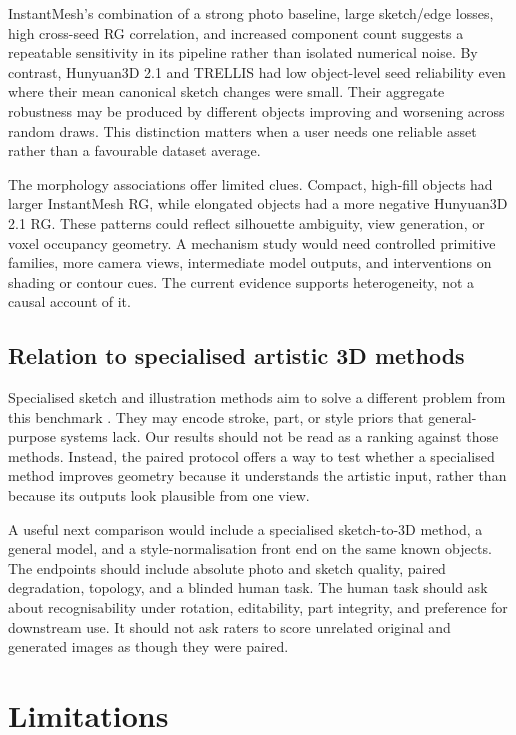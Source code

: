 \documentclass[12pt,a4paper]{article}
\begin{document}
InstantMesh's combination of a strong photo baseline, large sketch/edge losses, high cross-seed RG correlation, and increased component count suggests a repeatable sensitivity in its pipeline rather than isolated numerical noise. By contrast, Hunyuan3D 2.1 and TRELLIS had low object-level seed reliability even where their mean canonical sketch changes were small. Their aggregate robustness may be produced by different objects improving and worsening across random draws. This distinction matters when a user needs one reliable asset rather than a favourable dataset average.

The morphology associations offer limited clues. Compact, high-fill objects had larger InstantMesh RG, while elongated objects had a more negative Hunyuan3D 2.1 RG. These patterns could reflect silhouette ambiguity, view generation, or voxel occupancy geometry. A mechanism study would need controlled primitive families, more camera views, intermediate model outputs, and interventions on shading or contour cues. The current evidence supports heterogeneity, not a causal account of it.

\subsection{Relation to specialised artistic 3D methods}

Specialised sketch and illustration methods aim to solve a different problem from this benchmark \parencite{sanghi2023sketchashape,zheng2024sketch3d,lee2025pasta,cong2025art3d}. They may encode stroke, part, or style priors that general-purpose systems lack. Our results should not be read as a ranking against those methods. Instead, the paired protocol offers a way to test whether a specialised method improves geometry because it understands the artistic input, rather than because its outputs look plausible from one view.

A useful next comparison would include a specialised sketch-to-3D method, a general model, and a style-normalisation front end on the same known objects. The endpoints should include absolute photo and sketch quality, paired degradation, topology, and a blinded human task. The human task should ask about recognisability under rotation, editability, part integrity, and preference for downstream use. It should not ask raters to score unrelated original and generated images as though they were paired.

\section{Limitations}
\end{document}
